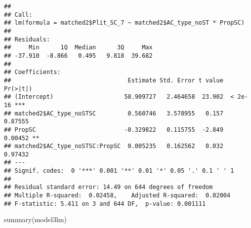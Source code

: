 \documentclass[
]{article}
\newenvironment{Shaded}{\begin{snugshade}}{\end{snugshade}}
\newcommand{\FunctionTok}[1]{\textcolor[rgb]{0.00,0.00,0.00}{#1}}
\newcommand{\NormalTok}[1]{#1}
\newcommand{\OtherTok}[1]{\textcolor[rgb]{0.56,0.35,0.01}{#1}}
\newcommand{\SpecialCharTok}[1]{\textcolor[rgb]{0.00,0.00,0.00}{#1}}
\begin{document}
\begin{Shaded}
\end{Shaded}

\begin{verbatim}
## 
## Call:
## lm(formula = matched2$Plit_SC_7 ~ matched2$AC_type_noST * PropSC)
## 
## Residuals:
##     Min      1Q  Median      3Q     Max 
## -37.910  -8.866   0.495   9.818  39.682 
## 
## Coefficients:
##                                 Estimate Std. Error t value Pr(>|t|)    
## (Intercept)                    58.909727   2.464658  23.902  < 2e-16 ***
## matched2$AC_type_noSTSC         0.560746   3.578955   0.157  0.87555    
## PropSC                         -0.329822   0.115755  -2.849  0.00452 ** 
## matched2$AC_type_noSTSC:PropSC  0.005235   0.162562   0.032  0.97432    
## ---
## Signif. codes:  0 '***' 0.001 '**' 0.01 '*' 0.05 '.' 0.1 ' ' 1
## 
## Residual standard error: 14.49 on 644 degrees of freedom
## Multiple R-squared:  0.02458,    Adjusted R-squared:  0.02004 
## F-statistic: 5.411 on 3 and 644 DF,  p-value: 0.001111
\end{verbatim}

\begin{Shaded}
\begin{Highlighting}[]
\FunctionTok{summary}\NormalTok{(model3lm)}
\end{Highlighting}
\end{Shaded}
\end{document}
